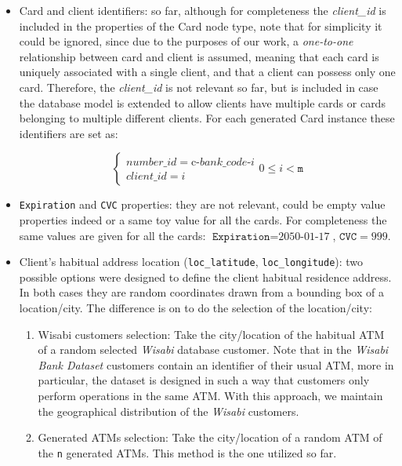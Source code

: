 \documentclass{article}
\begin{document}
\begin{itemize}
\item Card and client identifiers:
so far, although for completeness the \emph{client\_id} is included in the properties of the Card node type, note that for simplicity it could be ignored, since due to the purposes of our work, a \emph{one-to-one} relationship between card and client 
is assumed, meaning that each card is uniquely associated with a single client, and that a client
can possess only one card. Therefore, the \emph{client\_id} is not relevant so far, but is included
in case the database model is extended to allow clients have multiple cards or cards belonging to 
multiple different clients. For each generated Card instance these identifiers are set as:

\[
\begin{cases} 
number\_id = \text{c-}bank\_code\text{-}i \\
client\_id = i 
\end{cases}
0 \leq i < \texttt{m}
\]

\item \texttt{Expiration} and \texttt{CVC} properties: they are not relevant, could be empty 
  value properties indeed or a same toy value for all the cards. For completeness the  
  same values are given for all the cards: $\texttt{Expiration} = \text{2050-01-17}$, $\texttt{CVC} = 999$.

\item Client's habitual address location (\texttt{loc\_latitude}, \texttt{loc\_longitude}): two possible options were designed to define the client habitual residence address. In both 
cases they are random 
coordinates drawn from a bounding box of a location/city. The difference is on to do the selection of the location/city:

  \begin{enumerate}
      \item Wisabi customers selection: Take the city/location of the habitual ATM of a random selected \emph{Wisabi} database customer. Note that in the \emph{Wisabi Bank Dataset} customers contain an identifier
      of their usual ATM, more in particular, the dataset is designed in such a way that customers
      only perform operations in the same ATM.
      With this approach, we maintain the geographical distribution of the \emph{Wisabi} customers.
      \item Generated ATMs selection: Take the city/location of a random ATM of the \texttt{n} generated ATMs. This method is the one utilized so far.
  \end{enumerate}


\end{itemize}
\end{document}
